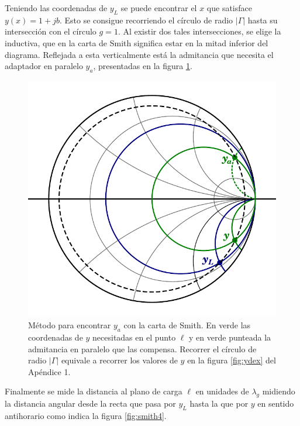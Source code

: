 \documentclass[11pt,a4paper]{article}
\begin{document}
\begin{appendices}
\begin{multicols}{2}
    Teniendo las coordenadas de $y_L$ se puede encontrar el $x$ que satisface $y(x)=1+jb$. Esto se consigue recorriendo el círculo de radio $\left|\Gamma\right|$ hasta su intersección con el círculo $g=1$.
    Al existir dos tales intersecciones, se elige la inductiva, que en la carta de Smith significa estar en la mitad inferior del diagrama. Reflejada a esta verticalmente está la admitancia que necesita el adaptador en paralelo $y_a$, presentadas en la figura \ref{fig:smith3}.

    \begin{figure}[H]
        \centering
        \includegraphics[width=0.8\linewidth]{Images/smith2.pdf}
        \caption{Método para encontrar $y_a$ con la carta de Smith. En verde las coordenadas de $y$ necesitadas en el punto $\ell$ y en verde punteada la admitancia en paralelo que las compensa. Recorrer el círculo de radio $|\Gamma|$ equivale a recorrer los valores de $y$ en la figura \ref{fig:ydex} del Apéndice 1.}
        \label{fig:smith3}
    \end{figure}
    Finalmente se mide la distancia al plano de carga $\ell$ en unidades de $\lambda_g$ midiendo la distancia angular desde la recta que pasa por $y_L$ hasta la que por $y$ en sentido antihorario como indica la figura \ref{fig:smith4}.
    \begin{figure}[H]
        \centering

\end{figure}
\end{multicols}
\end{appendices}
\end{document}
